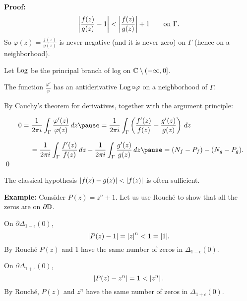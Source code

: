\documentclass[10pt,aspectratio=169]{beamer}
\begin{document}
\begin{frame}
\textbf{Proof:}
\begin{equation*}
\left\lvert {\frac{f(z)}{g(z)} - 1} \right\rvert <
\left\lvert {\frac{f(z)}{g(z)}} \right\rvert + 1
\qquad \text{on } \Gamma .
\end{equation*}
\pause
So
$\varphi(z) = \frac{f(z)}{g(z)}$ is never negative (and it is never zero) on
$\Gamma$ (hence on a neighborhood).

\pause
\medskip

Let $\operatorname{Log}$ be the principal branch of log on ${\mathbb{C}} \setminus (-\infty,0]$.

\pause
\medskip

The function
$\frac{\varphi'}{\varphi}$ has an antiderivative $\operatorname{Log} \circ \varphi$ on a neighborhood of $\Gamma$.

\pause
\medskip

By Cauchy's theorem for derivatives,
together with the argument principle:

\medskip

$
\displaystyle
\qquad
0
= \frac{1}{2\pi i} \int_{\Gamma} \frac{\varphi'(z)}{\varphi(z)} \, dz
\pause
=
\frac{1}{2\pi i} \int_{\Gamma}
\left( \frac{f'(z)}{f(z)} - \frac{g'(z)}{g(z)} \right) \, dz 
$

\medskip
\pause

$\displaystyle
\qquad\qquad
=
\frac{1}{2\pi i} \int_{\Gamma}
\frac{f'(z)}{f(z)} \, dz 
-
\frac{1}{2\pi i} \int_{\Gamma}
\frac{g'(z)}{g(z)} \, dz 
\pause
=
(N_f - P_f) - (N_g - P_g) .
\quad
$
\qed
\end{frame}

\begin{frame}
The classical hypothesis $\lvert {f(z)-g(z)} \rvert < \lvert {f(z)} \rvert$ is often
sufficient.

\medskip
\pause

\textbf{Example:}
Consider $P(z) = z^n + 1$.
Let us use Rouch\'e to show that all the zeros are on $\partial {\mathbb{D}}$.

\medskip
\pause

On $\partial \Delta_{1-\epsilon}(0)$,
\[
\left\lvert {P(z) - 1} \right\rvert = \left\lvert {z} \right\rvert^n < 1 = \lvert {1} \rvert.
\]
\pause
By Rouch\'e %
$P(z)$ and $1$ have the same number of zeros in 
$\Delta_{1-\epsilon}(0)$.

\medskip
\pause

On $\partial \Delta_{1+\epsilon}(0)$,
\begin{equation*}
\left\lvert {P(z) - z^n} \right\rvert = 1 < \left\lvert {z^n} \right\rvert .
\end{equation*}
By Rouch\'e,
$P(z)$ and $z^n$ have the same number of zeros in 
$\Delta_{1+\epsilon}(0)$.
\end{frame}
\end{document}
